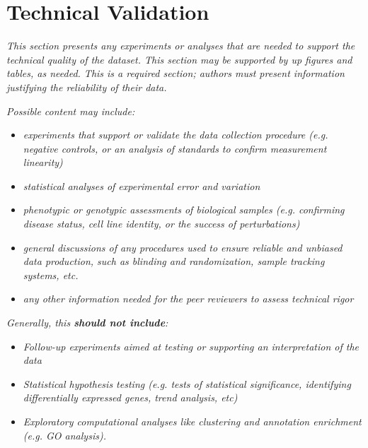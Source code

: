 \section{Technical Validation}

\textit{This section presents any experiments or analyses that are needed to support the technical quality of the dataset.  This section may be supported by up figures and tables, as needed. \textit{This is a required section}; authors must present information justifying the reliability of their data.}

\textit{Possible content may include:}
\begin{itemize}
\item \textit{experiments that support or validate the data collection procedure (e.g. negative controls, or an analysis of standards to confirm measurement linearity)}
\item \textit{statistical analyses of experimental error and variation}
\item \textit{phenotypic or genotypic assessments of biological samples (e.g. confirming disease status, cell line identity, or the success of perturbations)}
\item \textit{general discussions of any procedures used to ensure reliable and unbiased data production, such as blinding and randomization, sample tracking systems, etc. }
\item \textit{any other information needed for the peer reviewers to assess technical rigor}
\end{itemize}

\textit{Generally, this \textbf{should not include}:}
\begin{itemize}
\item \textit{Follow-up experiments aimed at testing or supporting an interpretation of the data}
\item \textit{Statistical hypothesis testing (e.g. tests of statistical significance, identifying differentially expressed genes, trend analysis, etc)}
\item \textit{Exploratory computational analyses like clustering and annotation enrichment (e.g. GO analysis). }
\end{itemize}
